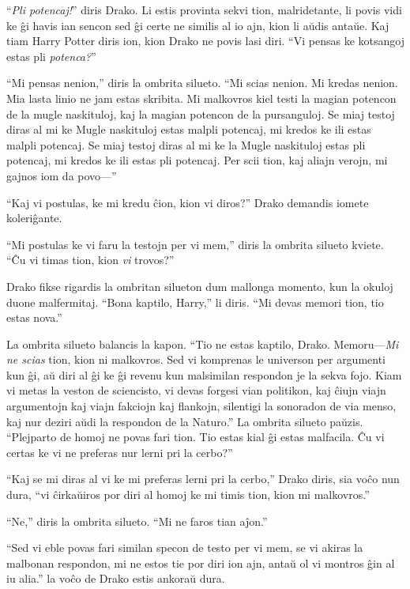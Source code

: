 ``\emph{Pli potencaj!}'' diris Drako. Li estis provinta sekvi tion,
malridetante, li povis vidi ke ĝi havis ian sencon sed ĝi certe ne
similis al io ajn, kion li aŭdis antaŭe. Kaj tiam Harry Potter diris
ion, kion Drako ne povis lasi diri. ``Vi pensas ke kotsangoj estas pli
\emph{potenca?}''

``Mi pensas nenion,'' diris la ombrita silueto. ``Mi scias nenion. Mi
kredas nenion. Mia lasta linio ne jam estas skribita. Mi malkovros
kiel testi la magian potencon de la mugle naskituloj, kaj la magian
potencon de la pursanguloj. Se miaj testoj diras al mi ke Mugle
naskituloj estas malpli potencaj, mi kredos ke ili estas malpli
potencaj. Se miaj testoj diras al mi ke la Mugle naskituloj estas pli
potencaj, mi kredos ke ili estas pli potencaj. Per scii tion, kaj
aliajn verojn, mi gajnos iom da povo—''

``Kaj vi postulas, ke mi kredu ĉion, kion vi diros?'' Drako demandis
iomete koleriĝante.

``Mi postulas ke vi faru la testojn per vi mem,'' diris la ombrita
silueto kviete. ``Ĉu vi timas tion, kion \emph{vi} trovos?''

Drako fikse rigardis la ombritan silueton dum mallonga momento, kun la
okuloj duone malfermitaj. ``Bona kaptilo, Harry,'' li diris. ``Mi
devas memori tion, tio estas nova.''

La ombrita silueto balancis la kapon. ``Tio ne estas kaptilo,
Drako. Memoru—\emph{Mi ne scias} tion, kion ni malkovros. Sed vi
komprenas le universon per argumenti kun ĝi, aŭ diri al ĝi ke ĝi
revenu kun malsimilan respondon je la sekva fojo. Kiam vi metas la
veston de sciencisto, vi devas forgesi vian politikon, kaj ĉiujn viajn
argumentojn kaj viajn fakciojn kaj flankojn, silentigi la sonoradon de
via menso, kaj nur deziri aŭdi la respondon de la Naturo.'' La ombrita
silueto paŭzis. ``Plejparto de homoj ne povas fari tion. Tio estas
kial ĝi estas malfacila. Ĉu vi certas ke vi ne preferas nur lerni pri
la cerbo?''

``Kaj se mi diras al vi ke mi preferas lerni pri la cerbo,'' Drako
diris, sia voĉo nun dura, ``vi ĉirkaŭiros por diri al homoj ke mi
timis tion, kion mi malkovros.''

``Ne,'' diris la ombrita silueto. ``Mi ne faros tian aĵon.''

``Sed vi eble povas fari similan specon de testo per vi mem, se vi
akiras la malbonan respondon, mi ne estos tie por diri ion ajn, antaŭ
ol vi montros ĝin al iu alia.'' la voĉo de Drako estis ankoraŭ dura.

